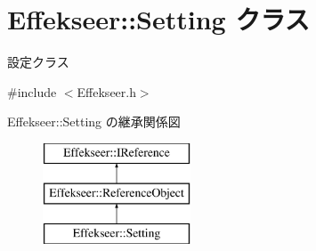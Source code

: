 \hypertarget{class_effekseer_1_1_setting}{}\section{Effekseer\+:\+:Setting クラス}
\label{class_effekseer_1_1_setting}


設定クラス  




{\ttfamily \#include $<$Effekseer.\+h$>$}

Effekseer\+:\+:Setting の継承関係図\begin{figure}[H]
\begin{center}
\leavevmode
\includegraphics[height=3.000000cm]{class_effekseer_1_1_setting}
\end{center}
\end{figure}
